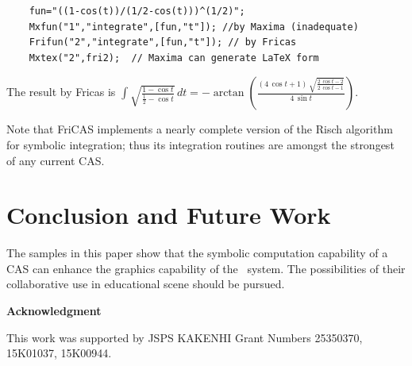 \documentclass[11pt]{article}
\begin{document}
{\small
\begin{verbatim}
    fun="((1-cos(t))/(1/2-cos(t)))^(1/2)";
    Mxfun("1","integrate",[fun,"t"]); //by Maxima (inadequate)
    Frifun("2","integrate",[fun,"t"]); // by Fricas
    Mxtex("2",fri2);  // Maxima can generate LaTeX form
\end{verbatim}\vspace{-1mm}
}

\noindent
The result by Fricas is $\displaystyle\int \sqrt{\frac{1-\cos
    t}{\frac{1}{2}-\cos t}} \,dt=-\arctan \left(\frac{\left(4\,\cos
      t+1\right)\,\sqrt{\frac{2\,\cos  t-2}{2\,\cos t-1}}}{4\,\sin t}\right) $.

Note that FriCAS implements a nearly complete version of the Risch algorithm for
symbolic integration; thus its integration routines are amongst the strongest of
any current CAS.

\section{Conclusion and Future Work}

The samples in this paper show that the symbolic computation capability of a CAS
can enhance the graphics capability of the \ketcindy\ system. The possibilities
of their collaborative use in educational scene should be pursued.



\vspace{4mm}

\noindent
{\bf Acknowledgment}

\noindent
This work was supported by JSPS KAKENHI Grant Numbers 
25350370, 15K01037, 15K00944.
\end{document}
